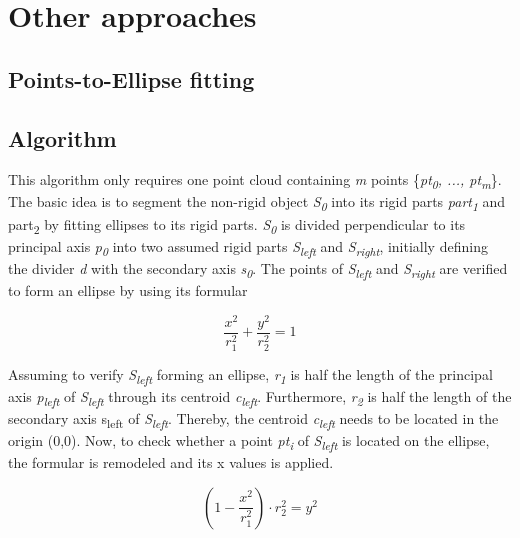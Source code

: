 \section{Other approaches}

\subsection{Points-to-Ellipse fitting}

\subsection{Algorithm}

This algorithm only requires one point cloud containing \textit{m} points \{\textit{pt\textsubscript{0}, ..., pt\textsubscript{m}}\}. The basic idea is to segment the non-rigid object  \textit{S\textsubscript{0}} into its rigid parts \textit{part\textsubscript{1}} and {part\textsubscript{2}} by fitting ellipses to its rigid parts. 
\textit{S\textsubscript{0}} is divided perpendicular to its principal axis \textit{p\textsubscript{0}} into two assumed rigid parts \textit{S\textsubscript{left}} and \textit{S\textsubscript{right}}, initially defining the divider \textit{d} with the secondary axis \textit{s\textsubscript{0}}. The points of \textit{S\textsubscript{left}} and \textit{S\textsubscript{right}} are verified to 
form an ellipse by using its formular

\begin{equation}
\dfrac{x^2}{r_1^2} + \dfrac{y^2}{r_2^2} = 1
\end{equation}

Assuming to verify \textit{S\textsubscript{left}} forming an ellipse, \textit{r\textsubscript{1}} is half the length of the principal axis \textit{p\textsubscript{left}} of \textit{S\textsubscript{left}} through its centroid \textit{c\textsubscript{left}}. Furthermore, \textit{r\textsubscript{2}} is half the length of the secondary axis {s\textsubscript{left}} of \textit{S\textsubscript{left}}. Thereby, the centroid \textit{c\textsubscript{left}} needs to be located in the origin (0,0). 
Now, to check whether a point \textit{pt\textsubscript{i}} of \textit{S\textsubscript{left}} is located on the ellipse, the formular is remodeled and its x values is applied. 

\begin{equation}
(1 -  \dfrac{x^2}{r_1^2}) \cdot {r_2^2} = y^2
\end{equation}

